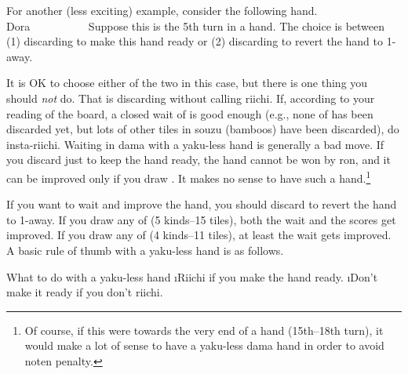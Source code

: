 \bigskip

For another (less exciting) example, consider the following hand.
\bp
{}~~\bei\\
\hfill\footnotesize{{\jap Dora}~~~~~~~~~~}
\ep
Suppose this is the 5th turn in a hand. The choice is between (1) discarding {\LARGE{}} to make this hand ready or (2) discarding {\LARGE{}} to revert the hand to 1-away.

\bigskip
It is OK to choose either of the two in this case, but there is one thing you should \emph{not} do. That is discarding {\LARGE{}} without calling riichi.
If, according to your reading of the board, a closed wait of {\LARGE{}} is good enough (e.g., none of {\LARGE {}} has been discarded yet, but lots of other tiles in {\jap souzu} (bamboos) have been discarded), do insta-riichi. Waiting in {\jap dama} with a {\jap yaku}-less hand is generally a bad move. If you discard {\LARGE{}} just to keep the hand ready, the hand cannot be won by {\jap ron}, and it can be improved only if you draw {\LARGE{}}. It makes no sense to have such a hand.\footnote{Of course, if this were towards the very end of a hand (15th--18th turn), it would make a lot of sense to have a {\jap yaku}-less {\jap dama} hand in order to avoid {\jap noten} penalty.}

\bigskip
If you want to wait and improve the hand, you should discard {\LARGE{}} to revert the hand to 1-away. If you draw any of {\LARGE{}} (5 kinds--15 tiles), both the wait and the scores get improved. If you draw any of {\LARGE{}} (4 kinds--11 tiles), at least the wait gets improved.
A basic rule of thumb with a {\jap yaku}-less hand is as follows.

\bigskip

\begin{itembox}[c]{What to do with a {\jap yaku}-less hand}
\bi
\i Riichi if you make the hand ready.
\i Don't make it ready if you don't riichi.
\vsps
\ei
\end{itembox}

